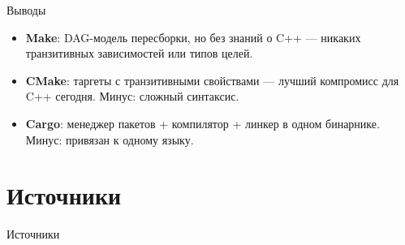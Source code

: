 \documentclass{beamer}
\begin{document}
\begin{frame}{Выводы}
\begin{itemize}
\item \textbf{Make}: DAG-модель пересборки, но без знаний о C++ —
никаких транзитивных зависимостей или типов целей.
\item \textbf{CMake}: таргеты с транзитивными свойствами —
лучший компромисс для C++ сегодня. Минус: сложный синтаксис.
\item \textbf{Cargo}: менеджер пакетов + компилятор + линкер
в одном бинарнике. Минус: привязан к одному языку.
\end{itemize}
\end{frame}

\section{Источники}

\begin{frame}[allowframebreaks]{Источники}
\nocite{iso_cpp_odr,cpp20_modules,gnu_make,cmake_docs,cargo_book,elf_spec,itanium_abi,mold_docs,gcc_lto}


\end{frame}
\end{document}

